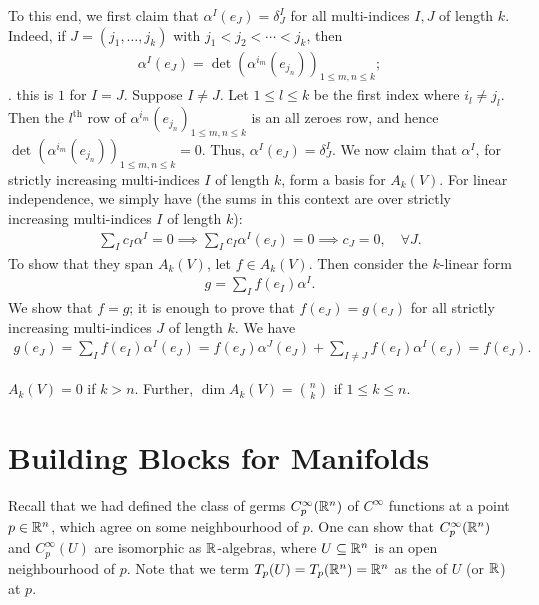 To this end, we first claim that $\alpha^{I}(e_{J}) = \delta_{J}^{I}$ for all multi-indices $I,J$ of length $k$. Indeed, if $J = (j_{1},\ldots,j_{k})$ with $j_{1} < j_{2} < \cdots < j_{k}$, then
\begin{align}
    \alpha^{I}(e_{J}) = \det(\alpha^{i_{m}}(e_{j_{n}}))_{1 \leq m,n \leq k};
\end{align}.
this is $1$ for $I = J$. Suppose $I \neq J$. Let $1 \leq l \leq k$ be the first index where $i_{l} \neq j_{l}$. Then the $l^{\text{th}}$ row of $\alpha^{i_{m}}(e_{j_{n}})_{1 \leq m,n \leq k}$ is an all zeroes row, and hence $\det(\alpha^{i_{m}}(e_{j_{n}}))_{1 \leq m,n \leq k} = 0$. Thus, $\alpha^{I}(e_{J}) = \delta_{J}^{I}$. We now claim that $\alpha^{I}$, for strictly increasing multi-indices $I$ of length $k$, form a basis for $A_{k}(V)$. For linear independence, we simply have (the sums in this context are over strictly increasing multi-indices $I$ of length $k$):
\begin{align}
    \sum_{I} c_{I} \alpha^{I} = 0 \implies \sum_{I} c_{I} \alpha^{I}(e_{J}) = 0 \implies c_{J} = 0, \quad \forall J.
\end{align}
To show that they span $A_{k}(V)$, let $f \in A_{k}(V)$. Then consider the $k$-linear form
\begin{align}
    g = \sum_{I} f(e_{I}) \alpha^{I}.
\end{align}
We show that $f=g$; it is enough to prove that $f(e_{J}) = g(e_{J})$ for all strictly increasing multi-indices $J$ of length $k$. We have
\begin{align}
    g(e_{J}) = \sum_{I} f(e_{I}) \alpha^{I}(e_{J}) = f(e_{J}) \alpha^{J}(e_{J}) + \sum_{I \neq J} f(e_{I}) \alpha^{I}(e_{J}) = f(e_{J}).
\end{align}

\begin{corollary}
    $A_{k}(V) = 0$ if $k > n$. Further, $\dim A_{k}(V) = \binom{n}{k}$ if $1 \leq k \leq n$.
\end{corollary}


\section{Building Blocks for Manifolds}
Recall that we had defined the class of germs $C_{p}^{\infty}(\mathbb{R}^{n})$ of $C^{\infty}$ functions at a point $p \in \mathbb{R}^{n}$, which agree on some neighbourhood of $p$. One can show that $C_{p}^{\infty}(\mathbb{R}^{n})$ and $C_{p}^{\infty}(U)$ are isomorphic as $\mathbb{R}$-algebras, where $U \subseteq \mathbb{R}^{n}$ is an open neighbourhood of $p$. Note that we term $T_{p}(U) = T_{p}(\mathbb{R}^{n}) = \mathbb{R}^{n}$ as the  of $U$ (or $\mathbb{R}$) at $p$. 

